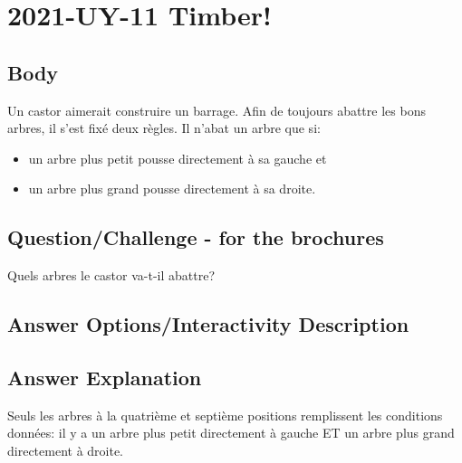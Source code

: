 \documentclass[a4paper,11pt]{report}
\newcommand{\taskGraphicsFolder}{..}
\begin{document}
\section*{\centering{} 2021-UY-11 Timber!}


\subsection*{Body}

Un castor aimerait construire un barrage. Afin de toujours abattre les bons arbres, il s’est fixé deux règles. Il n’abat un arbre que si:

\begin{itemize}
  \item un arbre plus petit pousse directement à sa gauche et
  \item un arbre plus grand pousse directement à sa droite.
\end{itemize}

{\em


\subsection*{Question/Challenge - for the brochures}

Quels arbres le castor va-t-il abattre?

{\centering%
\par}

}

\begingroup
\renewcommand{\arraystretch}{1.5}
\subsection*{Answer Options/Interactivity Description}



\endgroup

\subsection*{Answer Explanation}

Seuls les arbres à la quatrième et septième positions remplissent les conditions données: il y a un arbre plus petit directement à gauche ET un arbre plus grand directement à droite.

{\centering%
\par}
\end{document}
